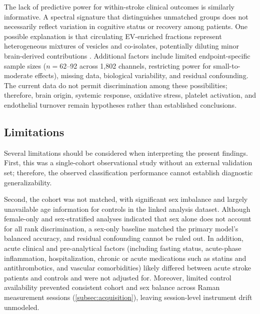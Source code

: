 \documentclass[preprint,12pt]{elsarticle}
\begin{document}
The lack of predictive power for within-stroke clinical outcomes is similarly informative. A spectral signature that distinguishes unmatched groups does not necessarily reflect variation in cognitive status or recovery among patients. One possible explanation is that circulating EV-enriched fractions represent heterogeneous mixtures of vesicles and co-isolates, potentially diluting minor brain-derived contributions \cite{liu2025}. Additional factors include limited endpoint-specific sample sizes ($n=62$--92 across 1,802 channels, restricting power for small-to-moderate effects), missing data, biological variability, and residual confounding. The current data do not permit discrimination among these possibilities; therefore, brain origin, systemic response, oxidative stress, platelet activation, and endothelial turnover remain hypotheses rather than established conclusions.


\subsection{Limitations} 
\label{subsec:limitations}

Several limitations should be considered when interpreting the present findings. First, this was a single-cohort observational study without an external validation set; therefore, the observed classification performance cannot establish diagnostic generalizability.

Second, the cohort was not matched, with significant sex imbalance and largely unavailable age information for controls in the linked analysis dataset. Although female-only and sex-stratified analyses indicated that sex alone does not account for all rank discrimination, a sex-only baseline matched the primary model's balanced accuracy, and residual confounding cannot be ruled out. In addition, acute clinical and pre-analytical factors (including fasting status, acute-phase inflammation, hospitalization, chronic or acute medications such as statins and antithrombotics, and vascular comorbidities) likely differed between acute stroke patients and controls and were not adjusted for. Moreover, limited control availability prevented consistent cohort and sex balance across Raman measurement sessions (\cref{subsec:acquisition}), leaving session-level instrument drift unmodeled.
\end{document}
